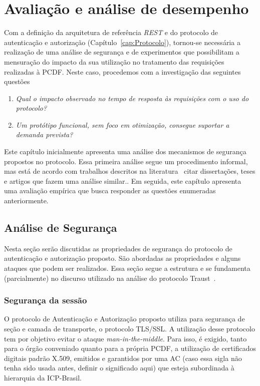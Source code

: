 \chapter{Avaliação e análise de desempenho}

Com a definição da arquitetura de referência \emph{REST}  e do protocolo de autenticação e autorização (Capítulo~\ref{cap:Protocolo}), 
tornou-se necess\'{a}ria a realiza\c c\~{a}o de uma an\'{a}lise de seguran\c ca e de experimentos que possibilitam a mensuração do 
impacto da sua utilização no tratamento das requisi\c c\~{o}es realizadas \`{a} PCDF. Neste caso, procedemos com 
a investiga\c c\~{a}o das seguintes quest\~{o}es

\parbox{0.8\textwidth}{
\begin{enumerate}[(Q1)]
\item \emph{Qual o impacto observado no tempo de resposta às requisi\c c\~{o}es com o uso do protocolo?}
\item \emph{Um prot\'{o}tipo funcional, sem foco em otimiza\c c\~{a}o, consegue suportar a demanda prevista?}
\end{enumerate}}


Este capítulo inicialmente apresenta uma an\'{a}lise dos mecanismos de seguran\c ca propostos no protocolo. Essa primeira 
an\'{a}lise segue um procedimento informal, mas est\'{a} de acordo com trabalhos descritos na literatura~\cite{} {\color{red}citar 
disserta\c c\~{o}es, teses e artigos que fazem uma an\'{a}lise similar.}. Em seguida, este cap\'{i}tulo apresenta uma avalia\c c\~{a}o 
emp\'{i}rica que busca responder as quest\~{o}es enumeradas anteriormente. 

\section{Análise de Segurança}

Nesta seção serão discutidas as propriedades de segurança do protocolo de autenticação e autorização proposto. São abordadas as propriedades e alguns ataques que podem ser realizados. Essa seção segue a estrutura e se fundamenta (parcialmente) no discurso utilizado na an\'{a}lise do protocolo Traust~\cite{traust08}.

\subsection{Segurança da sessão}

O protocolo de Autenticação e Autorização proposto utiliza para segurança de {\color{red}seção} e camada de transporte, o protocolo 
TLS/SSL. A utilização desse protocolo tem por objetivo evitar o ataque \emph{man-in-the-middle}. Para isso, é exigido, tanto para o órgão conveniado quanto para a própria 
PCDF, a utiliza\c c\~{a}o de certificados digitais padrão X.509, emitidos e garantidos por uma {\color{red}AC (caso essa sigla n\~{a}o tenha sido usada antes, 
definir o significado aqui)} que esteja subordinada à hierarquia da ICP-Brasil.

